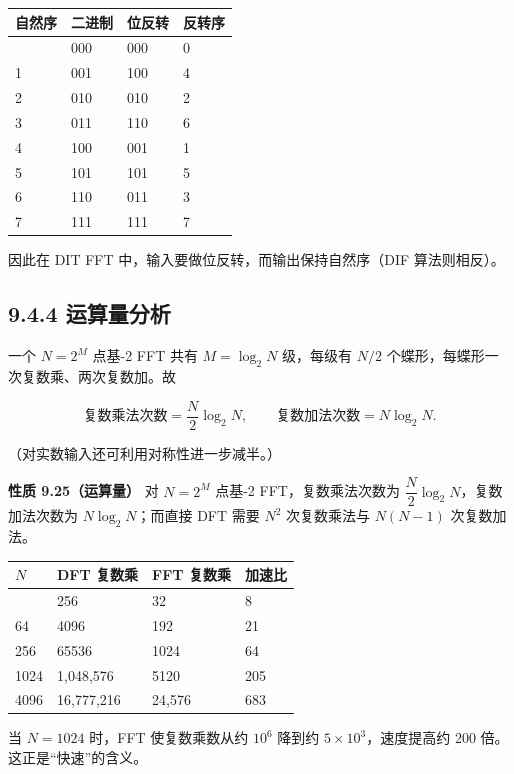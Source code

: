 {\def\LTcaptype{none} %
\begin{longtable}[]{@{}llll@{}}
\toprule\noalign{}
自然序 & 二进制 & 位反转 & 反转序 \\
\midrule\noalign{}
\endhead
\bottomrule\noalign{}
\endlastfoot
0 & 000 & 000 & 0 \\
1 & 001 & 100 & 4 \\
2 & 010 & 010 & 2 \\
3 & 011 & 110 & 6 \\
4 & 100 & 001 & 1 \\
5 & 101 & 101 & 5 \\
6 & 110 & 011 & 3 \\
7 & 111 & 111 & 7 \\
\end{longtable}
}

因此在 DIT FFT 中，输入要做位反转，而输出保持自然序（DIF 算法则相反）。

\subsection{9.4.4 运算量分析}\label{ux8fd0ux7b97ux91cfux5206ux6790}

一个 \(N=2^M\) 点基-2 FFT 共有 \(M=\log_2 N\) 级，每级有 \(N/2\)
个蝶形，每蝶形一次复数乘、两次复数加。故

\[
\text{复数乘法次数} = \frac{N}{2}\log_2 N,\qquad
\text{复数加法次数} = N\log_2 N .
\]

（对实数输入还可利用对称性进一步减半。）

\textbf{性质 9.25（运算量）} 对 \(N=2^M\) 点基-2 FFT，复数乘法次数为
\(\dfrac{N}{2}\log_2 N\)，复数加法次数为 \(N\log_2 N\)；而直接 DFT 需要
\(N^2\) 次复数乘法与 \(N(N-1)\) 次复数加法。

{\def\LTcaptype{none} %
\begin{longtable}[]{@{}llll@{}}
\toprule\noalign{}
\(N\) & DFT 复数乘 & FFT 复数乘 & 加速比 \\
\midrule\noalign{}
\endhead
\bottomrule\noalign{}
\endlastfoot
16 & 256 & 32 & 8 \\
64 & 4096 & 192 & 21 \\
256 & 65536 & 1024 & 64 \\
1024 & 1,048,576 & 5120 & 205 \\
4096 & 16,777,216 & 24,576 & 683 \\
\end{longtable}
}

当 \(N=1024\) 时，FFT 使复数乘数从约 \(10^6\) 降到约
\(5\times10^3\)，速度提高约 200 倍。这正是``快速''的含义。

